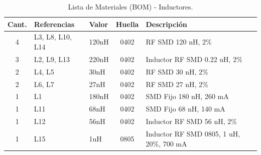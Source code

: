 \documentclass[11pt,a4paper,twoside]{report}
\begin{document}
	\begin{table}
		\centering
		\small
		\begin{tabularx}{\textwidth}{c p{5cm} l c X}
			\toprule
			\textbf{Cant.} & \textbf{Referencias} & \textbf{Valor} & \textbf{Huella} & \textbf{Descripción} \\
			\midrule
			4 & L3, L8, L10, L14 & 120nH & 0402 & RF SMD 120 nH, 2\% \\
			3 & L2, L9, L13 & 220nH & 0402 & Inductor RF SMD 0.22 uH, 2\% \\
			2 & L4, L5 & 30nH & 0402 & RF SMD 30 nH, 2\% \\
			2 & L6, L7 & 27nH & 0402 & RF SMD 27 nH, 2\% \\
			1 & L1 & 180nH & 0402 & SMD Fijo 180 nH, 260 mA \\
			1 & L11 & 68nH & 0402 & SMD Fijo 68 nH, 140 mA \\
			1 & L12 & 56nH & 0402 & Inductor RF SMD 56 nH, 2\% \\
			1 & L15 & 1uH & 0805 & Inductor RF SMD 0805, 1 uH, 20\%, 700 mA \\
			\bottomrule
		\end{tabularx}
		\caption{Lista de Materiales (BOM) - Inductores.}
		\label{tab:bom_inductores}
	\end{table}
	
\end{document}
